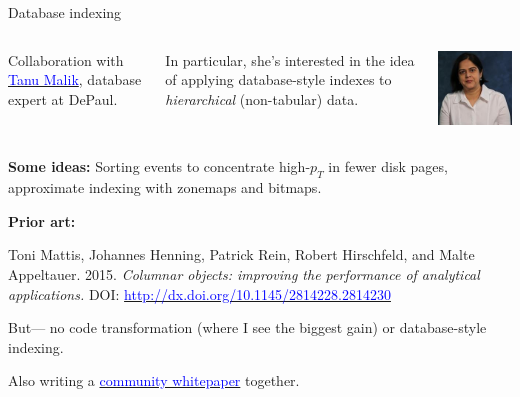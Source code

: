 \documentclass{beamer}
\begin{document}
\begin{frame}{Database indexing}
\vspace{0.5 cm}
\begin{columns}[c]
Collaboration with \href{http://www.cdm.depaul.edu/about/Pages/People/facultyinfo.aspx?fid=1328}{\textcolor{blue}{Tanu Malik}}, database expert at DePaul.

\vspace{0.2 cm}
In particular, she's interested in the idea of applying database-style indexes to {\it hierarchical} (non-tabular) data.

\includegraphics[width=\linewidth]{tanu.jpg}
\end{columns}

\vspace{0.2 cm}
{\bf Some ideas:}
Sorting events to concentrate high-$p_T$ in fewer disk pages, approximate indexing with zonemaps and bitmaps.

\vspace{0.35 cm}
\begin{minipage}{\linewidth}
{\bf Prior art:}

\scriptsize
Toni Mattis, Johannes Henning, Patrick Rein, Robert Hirschfeld, and Malte Appeltauer. 2015. {\it Columnar objects: improving the performance of analytical applications.} DOI: \href{http://dx.doi.org/10.1145/2814228.2814230}{\textcolor{blue}{http://dx.doi.org/10.1145/2814228.2814230}}
\end{minipage}

\vspace{0.1 cm}
But--- no code transformation (where I see the biggest gain) or database-style indexing.

\vspace{0.35 cm}
Also writing a \href{https://docs.google.com/document/d/1-ZrnsS3IZdH91_pb99OLGd4gxaMm3m3Vr7XBigpx8DE/edit?usp=sharing}{\textcolor{blue}{community whitepaper}} together.
\end{frame}
\end{document}
